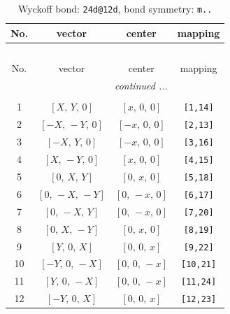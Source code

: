 \documentclass[fleqn,8pt]{jsarticle}
\begin{document}
\begin{longtable}{cccc}
\caption{Wyckoff bond: {\tt 24d@12d}, bond symmetry: {\tt m..}}
 \\
 \hline \hline
No. & vector & center & mapping \\ \hline \endfirsthead

\multicolumn{3}{l}{\tablename\ \thetable{}} \\
 \hline \hline
No. & vector & center & mapping \\ \hline \endhead

 \hline \hline
\multicolumn{3}{r}{\footnotesize\it continued ...} \\ \endfoot

 \hline \hline
\multicolumn{3}{r}{} \\ \endlastfoot

1 & $\left[ X,\, Y,\, 0 \right]$ & $\left[ x,\, 0,\, 0 \right]$ & {\tt [1,14]} \\ \hline
2 & $\left[ - X,\, - Y,\, 0 \right]$ & $\left[ - x,\, 0,\, 0 \right]$ & {\tt [2,13]} \\ \hline
3 & $\left[ - X,\, Y,\, 0 \right]$ & $\left[ - x,\, 0,\, 0 \right]$ & {\tt [3,16]} \\ \hline
4 & $\left[ X,\, - Y,\, 0 \right]$ & $\left[ x,\, 0,\, 0 \right]$ & {\tt [4,15]} \\ \hline
5 & $\left[ 0,\, X,\, Y \right]$ & $\left[ 0,\, x,\, 0 \right]$ & {\tt [5,18]} \\ \hline
6 & $\left[ 0,\, - X,\, - Y \right]$ & $\left[ 0,\, - x,\, 0 \right]$ & {\tt [6,17]} \\ \hline
7 & $\left[ 0,\, - X,\, Y \right]$ & $\left[ 0,\, - x,\, 0 \right]$ & {\tt [7,20]} \\ \hline
8 & $\left[ 0,\, X,\, - Y \right]$ & $\left[ 0,\, x,\, 0 \right]$ & {\tt [8,19]} \\ \hline
9 & $\left[ Y,\, 0,\, X \right]$ & $\left[ 0,\, 0,\, x \right]$ & {\tt [9,22]} \\ \hline
10 & $\left[ - Y,\, 0,\, - X \right]$ & $\left[ 0,\, 0,\, - x \right]$ & {\tt [10,21]} \\ \hline
11 & $\left[ Y,\, 0,\, - X \right]$ & $\left[ 0,\, 0,\, - x \right]$ & {\tt [11,24]} \\ \hline
12 & $\left[ - Y,\, 0,\, X \right]$ & $\left[ 0,\, 0,\, x \right]$ & {\tt [12,23]} \\
\end{longtable}
\renewcommand{\arraystretch}{1.2}
\end{document}

